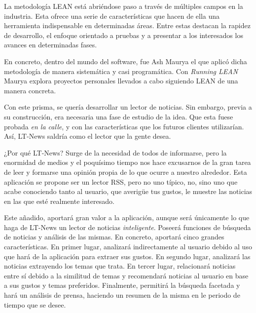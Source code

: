 
La metodología LEAN está abriéndose paso a través de múltiples campos en la industria. Esta ofrece una serie de características que hacen de ella una herramienta indispensable en determinadas áreas. Entre estas destacan la rapidez de desarrollo, el enfoque orientado a pruebas y a presentar a los interesados los avances en determinadas fases.

En concreto, dentro del mundo del software, fue Ash Maurya el que aplicó dicha metodología de manera sistemática y casi programática. Con \textit{Running LEAN} Maurya explora proyectos personales llevados a cabo siguiendo LEAN de una manera concreta.

Con este prisma, se quería desarrollar un lector de noticias. Sin embargo, previa a su construcción, era necesaria una fase de estudio de la idea. Que esta fuese probada \textit{en la calle}, y con las características que los futuros clientes utilizarían. Así, LT-News saldría como el lector que la gente desea.

¿Por qué LT-News? Surge de la necesidad de todos de informarse, pero la enormidad de medios y el poquísimo tiempo nos hace excusarnos de la gran tarea de leer y formarse una opinión propia de lo que ocurre a nuestro alrededor. Esta aplicación se propone ser un lector RSS, pero no uno típico, no, sino uno que acabe conociendo tanto al usuario, que averigüe tus gustos, le muestre las noticias en las que esté realmente interesado.

Este añadido, aportará gran valor a la aplicación, aunque será únicamente lo que haga de LT-News un lector de noticias \textit{inteligente}. Poseerá funciones de búsqueda de noticias y análisis de las mismas. En concreto, aportará cinco grandes características. En primer lugar, analizará indirectamente al usuario debido al uso que hará de la aplicación para extraer sus gustos. En segundo lugar, analizará las noticias extrayendo los temas que trata. En tercer lugar, relacionará noticias entre sí debido a la similitud de temas y recomendará noticias al usuario en base a sus gustos y temas preferidos. Finalmente, permitirá la búsqueda facetada y hará un análisis de prensa, haciendo un resumen de la misma en le periodo de tiempo que se desee. 
